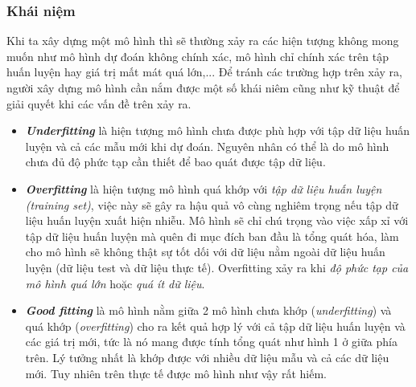 \subsubsection{Khái niệm}
  Khi ta xây dựng một mô hình thì sẽ thường xảy ra các hiện tượng không mong muốn như mô hình dự đoán không chính xác, mô hình chỉ chính xác trên tập huấn luyện hay giá trị mất mát quá lớn,... Để tránh các trường hợp trên xảy ra, người xây dựng mô hình cần nắm được một số khái niêm cũng như kỹ thuật để giải quyết khi các vấn đề trên xảy ra.
\begin{itemize}
\item []
\textit{\textbf{Underfitting}} là hiện tượng mô hình chưa được phù hợp với tập dữ liệu huấn luyện và cả các mẫu mới khi dự đoán. Nguyên nhân có thể là do mô hình chưa đủ độ phức tạp cần thiết để bao quát được tập dữ liệu.
\item []
\textit{\textbf{Overfitting}} là hiện tượng mô hình quá khớp với \textit{tập dữ liệu huấn luyện (training set)}, việc này sẽ gây ra hậu quả vô cùng nghiêm trọng nếu tập dữ liệu huấn luyện xuất hiện nhiễu. Mô hình sẽ chỉ chú trọng vào việc xấp xỉ với tập dữ liệu huấn luyện mà quên đi mục đích ban đầu là tổng quát hóa, làm cho mô hình sẽ không thật sự tốt dối với dữ liệu nằm ngoài dữ liệu huấn luyện (dữ liệu test và dữ liệu thực tế). Overfitting xảy ra khi \textit{độ phức tạp của mô hình quá lớn} hoặc \textit{quá ít dữ liệu}.
\item []
\textit{\textbf{Good fitting}} là mô hình nằm giữa 2 mô hình chưa khớp (\textit{underfitting}) và quá khớp (\textit{overfitting}) cho ra kết quả hợp lý với cả tập dữ liệu huấn luyện và các giá trị mới, tức là nó mang được tính tổng quát như hình 1 ở giữa phía trên. Lý tưởng nhất là khớp được với nhiều dữ liệu mẫu và cả các dữ liệu mới. Tuy nhiên trên thực tế được mô hình như vậy rất hiếm.
\end{itemize}
  
